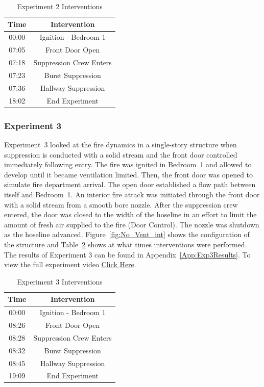 \documentclass[12pt,oneside]{book}
\begin{document}
\begin{table}[!ht]
	\centering
	\caption{Experiment 2 Interventions}
	\begin{tabular}{|c|c|} 
		\hline
		Time & Intervention \\ \hline \hline
		00:00 & Ignition - Bedroom 1 \\ \hline
		07:05 & Front Door Open \\ \hline
		07:18 & Suppression Crew Enters\\ \hline
		07:23 & Burst Suppression \\ \hline 
		07:36 & Hallway Suppression \\ \hline
		18:02 & End Experiment\\ \hline
	\end{tabular}
	\label{Table:Exp2Interventions}
\end{table}

\FloatBarrier

\subsubsection{Experiment 3}
Experiment~3 looked at the fire dynamics in a single-story structure when suppression is conducted with a solid stream and the front door controlled immediately following entry. The fire was ignited in Bedroom~1 and allowed to develop until it became ventilation limited. Then, the front door was opened to simulate fire department arrival. The open door established a flow path between itself and Bedroom~1. An interior fire attack was initiated through the front door with a solid stream from a smooth bore nozzle. After the suppression crew entered, the door was closed to the width of the hoseline in an effort to limit the amount of fresh air supplied to the fire (Door Control). The nozzle was shutdown as the hoseline advanced. Figure~\ref{fig:No_Vent_int} shows the configuration of the structure and Table~\ref{Table:Exp3Interventions} shows at what times interventions were performed. The results of Experiment 3 can be found in Appendix~\ref{App:Exp3Results}. To view the full experiment video \href{https://player.vimeo.com/video/170513516?autoplay=1}{Click Here}.

\begin{table}[!ht]
	\centering
	\caption{Experiment 3 Interventions}
	\begin{tabular}{|c|c|} 
		\hline
		Time & Intervention \\ \hline \hline
		00:00 & Ignition - Bedroom 1 \\ \hline
		08:26 & Front Door Open \\ \hline
		08:28 & Suppression Crew Enters\\ \hline
		08:32 & Burst Suppression \\ \hline 
		08:45 & Hallway Suppression \\ \hline
		19:09 & End Experiment\\ \hline
	\end{tabular}
	\label{Table:Exp3Interventions}
\end{table}
\end{document}
